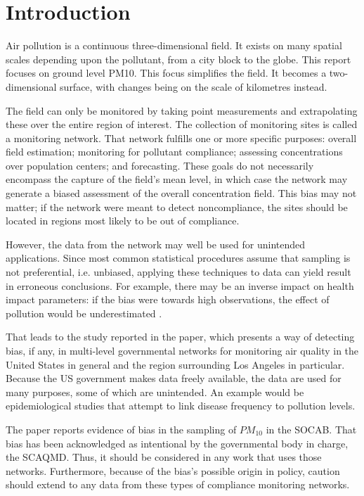 \section{Introduction}\label{sec:introduction}

Air pollution is a continuous three-dimensional field.  It exists on many spatial scales depending upon the pollutant, from a city block to the globe.  This report focuses on ground level \ac{PM10}.  This focus simplifies the field. It becomes a two-dimensional surface, with changes being on the scale of kilometres \citep{CFR:Title40-58} instead.   

The field can only be monitored by taking point measurements and extrapolating these over the entire region of interest. The collection of monitoring sites is called a monitoring network.  That network fulfills one or more specific purposes: overall field estimation; monitoring for pollutant compliance; assessing concentrations over population centers; and forecasting.  These goals do not necessarily encompass the capture of the field's mean level, in which case the network may generate a biased assessment of the overall concentration field. This bias may not matter; if the network were meant to detect noncompliance, the sites should be located in regions most likely to be out of compliance. 

However, the data from the network may well be used for unintended applications. Since most common statistical procedures assume that sampling is not preferential, i.e. unbiased, 
applying these techniques to data can yield result in erroneous conclusions.  For example, there may 
be an inverse impact on health impact parameters: if the bias were towards high observations, the effect of pollution would be underestimated \citep{Zidek:2012}.


That leads to the study reported in the paper, which presents a way of detecting bias, if any,
in multi-level governmental networks for monitoring air quality in the United States in general and the region surrounding Los Angeles in particular.  Because the US government makes data freely available, the data are used for many purposes, some of which are unintended. An example would be epidemiological studies that attempt to link disease frequency to pollution levels.

The paper reports evidence of bias in the sampling of $PM_{10}$ in the \ac{SOCAB}.  That bias has been acknowledged as intentional by the governmental body in charge, the \ac{SCAQMD}.  Thus, it should be considered in any work that uses those networks. Furthermore, because of the bias's possible origin in policy, caution should extend to any data from these types of compliance monitoring networks.

